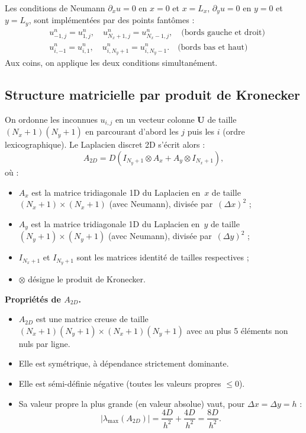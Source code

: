 \documentclass[11pt,a4paper]{report}
\begin{document}
Les conditions de Neumann $\partial_x u = 0$ en $x=0$ et $x=L_x$,
$\partial_y u = 0$ en $y=0$ et $y=L_y$, sont impl\'ement\'ees par des points fant\^omes :
\begin{align}
  &u_{-1,j}^n = u_{1,j}^n,\quad u_{N_x+1,j}^n = u_{N_x-1,j}^n,
  \quad\text{(bords gauche et droit)} \\
  &u_{i,-1}^n = u_{i,1}^n,\quad u_{i,N_y+1}^n = u_{i,N_y-1}^n.
  \quad\text{(bords bas et haut)}
\end{align}
Aux coins, on applique les deux conditions simultan\'ement.

\subsection*{Structure matricielle par produit de Kronecker}

On ordonne les inconnues $u_{i,j}$ en un vecteur colonne $\mathbf{U}$ de taille
$(N_x+1)(N_y+1)$ en parcourant d'abord les $j$ puis les $i$ (ordre lexico\-graphique).
Le Laplacien discret 2D s'\'ecrit alors :
\begin{equation}\label{eq:kron}
  \boxed{A_{2D} = D\!\left(I_{N_y+1} \otimes A_x + A_y \otimes I_{N_x+1}\right),}
\end{equation}
o\`u :
\begin{itemize}[leftmargin=1.5em]
  \item $A_x$ est la matrice tridiagonale 1D du Laplacien en~$x$ de taille
        $(N_x+1)\times(N_x+1)$ (avec Neumann), divis\'ee par~$(\Delta x)^2$ ;
  \item $A_y$ est la matrice tridiagonale 1D du Laplacien en~$y$ de taille
        $(N_y+1)\times(N_y+1)$ (avec Neumann), divis\'ee par~$(\Delta y)^2$ ;
  \item $I_{N_x+1}$ et $I_{N_y+1}$ sont les matrices identit\'e de tailles respectives ;
  \item $\otimes$ d\'esigne le produit de Kronecker.
\end{itemize}

\textbf{Propri\'et\'es de $A_{2D}$.}
\begin{itemize}[leftmargin=1.5em]
  \item $A_{2D}$ est une matrice creuse de taille
        $(N_x+1)(N_y+1)\times(N_x+1)(N_y+1)$
        avec au plus 5 \'el\'ements non nuls par ligne.
  \item Elle est sym\'etrique, \`a d\'ependance strictement dominante.
  \item Elle est s\'emi-d\'efinie n\'egative (toutes les valeurs propres $\le 0$).
  \item Sa valeur propre la plus grande (en valeur absolue) vaut, pour
        $\Delta x=\Delta y=h$ :
        \begin{equation}
          |\lambda_{\max}(A_{2D})| = \frac{4D}{h^2}+\frac{4D}{h^2} = \frac{8D}{h^2}.
        \end{equation}
\end{itemize}
\end{document}
